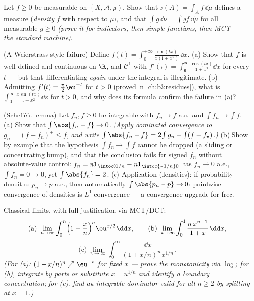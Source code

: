 \begin{exercise}[$\star\star$]\label{exo:b3:lebesgue:9}
Let $f \geq 0$ be measurable on $(X, \mathcal A, \mu)$. Show
that $\nu(A) = \int_A f\,\dd\mu$ defines a measure
(\emph{density} $f$ with respect to
$\mu$), and that $\int g\,\dd\nu = \int gf\,\dd\mu$ for all
measurable $g \geq 0$ \emph{(prove it for indicators, then
simple functions, then MCT --- the standard machine)}.
\end{exercise}

\begin{exercise}[$\star\star\star$]\label{exo:b3:lebesgue:10}
(A Weierstrass-style failure) Define $f(t) =
\int_0^{+\infty}\frac{\sin(tx)}{x(1 + x^2)}\,\dd x$.
(a) Show that $f$ is well defined and continuous on $\R$, and
$\mathcal C^1$ with $f'(t) = \int_0^\infty\frac{\cos(tx)}{1 +
x^2}\dd x$ for every $t$ --- but that differentiating
\emph{again} under the integral is illegitimate.
(b) Admitting $f'(t) = \frac\pi2\eu^{-t}$ for $t > 0$ (proved
in \cref{ch:b3:residues}), what is
$\int_0^\infty\frac{x\sin(tx)}{1+x^2}\dd x$ for $t > 0$, and
why does its formula confirm the failure in (a)?
\end{exercise}

\begin{exercise}[$\star\star$]\label{exo:b3:lebesgue:11}
(Scheff\'e's lemma) Let $f_n, f \geq 0$ be integrable with
$f_n \to f$ a.e.\ and $\int f_n \to \int f$.
(a) Show that $\int\abs{f_n - f} \to 0$. \emph{(Apply
dominated convergence to $g_n = (f - f_n)^+ \leq f$, and
write $\int\abs{f_n - f} = 2\int g_n - \int(f - f_n)$.)}
(b) Show by example that the hypothesis $\int f_n \to \int
f$ cannot be dropped (a sliding or concentrating bump), and
that the conclusion fails for signed $f_n$ without
absolute-value control: $f_n = n\mathbf 1_{\intoc0{1/n}} -
n\mathbf 1_{\intoc{-1/n}0}$ has $f_n \to 0$ a.e., $\int f_n
= 0 \to 0$, yet $\int\abs{f_n} = 2$.
(c) Application (densities): if probability densities $p_n
\to p$ a.e., then automatically $\int\abs{p_n - p} \to 0$:
pointwise convergence of densities is $L^1$ convergence ---
a convergence upgrade for free.
\end{exercise}

\begin{exercise}[$\star\star$]\label{exo:b3:lebesgue:12}
Classical limits, with full justification via MCT/DCT:
\[
\text{(a)}\ \lim_{n\to\infty}\int_0^n\Bigl(1 -
\frac xn\Bigr)^n\eu^{x/2}\,\dd x, \qquad
\text{(b)}\ \lim_{n\to\infty}\int_0^1\frac{n\,x^{n-1}}{1 +
x}\,\dd x,
\]
\[
\text{(c)}\ \lim_{n\to\infty}\int_0^\infty
\frac{\dd x}{(1 + x/n)^n\,x^{1/n}} .
\]
\emph{(For (a): $(1 - x/n)^n \nearrow \eu^{-x}$ for fixed
$x$ --- prove the monotonicity via $\log$; for (b),
integrate by parts or substitute $x = u^{1/n}$ and identify
a boundary concentration; for (c), find an integrable
dominator valid for all $n \geq 2$ by splitting at $x =
1$.)}
\end{exercise}

